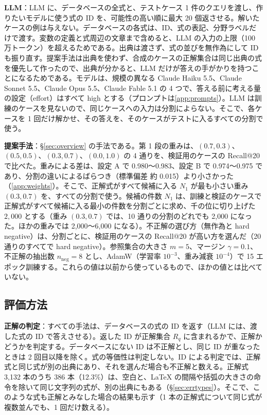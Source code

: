\documentclass[11pt,a4paper]{ltjsarticle}
\begin{document}
\textbf{LLM}：LLM に、データベースの全式と、テストケース 1 件のクエリを渡し、作りたいモデルに使う式の ID を、可能性の高い順に最大 20 個返させる。解いたケースの例は与えない。データベースの各式は、ID、式の表記、分野ラベルだけで渡す。変数の定義と式周辺の文章まで含めると、LLM の入力の上限（100 万トークン）を超えるためである。出典は渡さず、式の並びを無作為にして ID も振り直す。提案手法は出典を使わず、合成のケースの正解集合は同じ出典の式を優先して作ったので、出典が分かると、LLM だけが答えの手がかりを持つことになるためである。モデルは、規模の異なる Claude Haiku 5.5、Claude Sonnet 5.5、Claude Opus 5.5、Claude Fable 5.1 の 4 つで、答える前に考える量の設定（effort）はすべて high とする（プロンプトは\ref{app:prompts}）。LLM は訓練のケースを見ないので、同じケースへの入力は分割によらない。そこで、各ケースを 1 回だけ解かせ、その答えを、そのケースがテストに入るすべての分割で使う。

\textbf{提案手法}：\S\ref{sec:overview} の手法である。第 1 段の重みは、$(0.7, 0.3)$、$(0.5, 0.5)$、$(0.3, 0.7)$、$(0.0, 1.0)$ の 4 通りを、検証用のケースの Recall@20 で比べた。重みによる差は、設定 A で 0.980〜0.983、設定 B で 0.974〜0.975 であり、分割の違いによるばらつき（標準偏差 約 0.015）より小さかった（\ref{app:weights}）。そこで、正解式がすべて候補に入る $N_1$ が最も小さい重み $(0.3, 0.7)$ を、すべての分割で使う。候補の件数 $N_1$ は、訓練と検証のケースで正解式がすべて候補に入る最小の件数を分割ごとに求め、千の位に切り上げた $2{,}000$ とする（重み $(0.3, 0.7)$ では、10 通りの分割のどれでも 2{,}000 になった。ほかの重みでは 2{,}000〜6{,}000 になる）。不正解の選び方（無作為と hard negative）は、分割ごとに、検証用のケースの Recall@20 が高い方を選んだ（20 通りのすべてで hard negative）。参照集合の大きさ $m = 5$、マージン $\gamma = 0.1$、不正解の抽出数 $n_{\mathrm{neg}} = 8$ とし、AdamW（学習率 $10^{-3}$、重み減衰 $10^{-4}$）で 15 エポック訓練する。これらの値は以前から使っているもので、ほかの値とは比べていない。

\subsection{評価方法}\label{sec:eval}
\textbf{正解の判定}：すべての手法は、データベースの式の ID を返す（LLM には、渡した式の ID で答えさせる）。返した ID が正解集合 $R_q$ に含まれるかで、正解かどうかを判定する。データベースにない ID は不正解とし、同じ ID が重なったときは 2 回目以降を除く。式の等価性は判定しない。ID による判定では、正解式と同じ式が別の出典にあり、それを選んだ場合も不正解と数える。正解式 3{,}132 本のうち 386 本（12.3\%）は、空白と、\LaTeX{} の間隔や括弧の大きさの命令を除いて同じ文字列の式が、別の出典にもある（\S\ref{sec:errtypes}）。そこで、このような式も正解とみなした場合の結果も示す（1 本の正解式について同じ式が複数並んでも、1 回だけ数える）。
\end{document}
